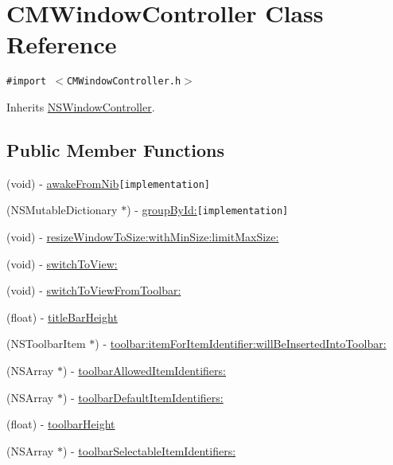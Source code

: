 \hypertarget{interface_c_m_window_controller}{
\section{CMWindowController Class Reference}
\label{interface_c_m_window_controller}
}
{\tt \#import $<$CMWindowController.h$>$}

Inherits \hyperlink{class_n_s_window_controller}{NSWindowController}.

\subsection*{Public Member Functions}
\begin{CompactItemize}
\item 
(void) - \hyperlink{interface_c_m_window_controller_90bc0db5d52824b64f3840ceabf8fc23}{awakeFromNib}{\tt  \mbox{[}implementation\mbox{]}}
\item 
(NSMutableDictionary $\ast$) - \hyperlink{interface_c_m_window_controller_270296afa392485f936b630d5e7e0633}{groupById:}{\tt  \mbox{[}implementation\mbox{]}}
\item 
(void) - \hyperlink{interface_c_m_window_controller_eb91277909122f15a5443b497ba0c29b}{resizeWindowToSize:withMinSize:limitMaxSize:}
\item 
(void) - \hyperlink{interface_c_m_window_controller_e14b0f7e31f166967f3f29a048689043}{switchToView:}
\item 
(void) - \hyperlink{interface_c_m_window_controller_ddf4b3a6a3679a5058026e32515c0cf1}{switchToViewFromToolbar:}
\item 
(float) - \hyperlink{interface_c_m_window_controller_ea152121637d5169165a54e790f5bdcd}{titleBarHeight}
\item 
(NSToolbarItem $\ast$) - \hyperlink{interface_c_m_window_controller_613c7f61a1b4830b616df8a23d8f12b9}{toolbar:itemForItemIdentifier:willBeInsertedIntoToolbar:}
\item 
(NSArray $\ast$) - \hyperlink{interface_c_m_window_controller_83412ac27a3c281c599e9d00ed8d1971}{toolbarAllowedItemIdentifiers:}
\item 
(NSArray $\ast$) - \hyperlink{interface_c_m_window_controller_a279ef0d596af18bf3cc33be365cc77c}{toolbarDefaultItemIdentifiers:}
\item 
(float) - \hyperlink{interface_c_m_window_controller_eac4c2bb1286f184886ac4ad40af899a}{toolbarHeight}
\item 
(NSArray $\ast$) - \hyperlink{interface_c_m_window_controller_09a848e0edfe89c56c873f0ccec55ec8}{toolbarSelectableItemIdentifiers:}
\end{CompactItemize}
